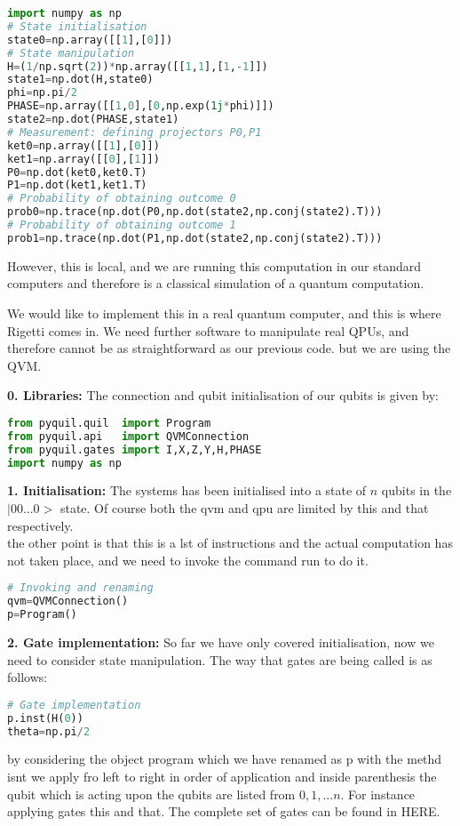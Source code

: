 \begin{lstlisting}[language=Python,caption={Example with python only},label={lst:ExamplePython},frame=single] 
import numpy as np
# State initialisation
state0=np.array([[1],[0]])
# State manipulation
H=(1/np.sqrt(2))*np.array([[1,1],[1,-1]])
state1=np.dot(H,state0)
phi=np.pi/2
PHASE=np.array([[1,0],[0,np.exp(1j*phi)]])
state2=np.dot(PHASE,state1)
# Measurement: defining projectors P0,P1
ket0=np.array([[1],[0]])
ket1=np.array([[0],[1]])
P0=np.dot(ket0,ket0.T)
P1=np.dot(ket1,ket1.T)
# Probability of obtaining outcome 0
prob0=np.trace(np.dot(P0,np.dot(state2,np.conj(state2).T)))
# Probability of obtaining outcome 1
prob1=np.trace(np.dot(P1,np.dot(state2,np.conj(state2).T)))
\end{lstlisting}
However, this is local, and we are running this computation in our standard computers and therefore is a classical simulation of a quantum computation.

We would like to implement this in a real quantum computer, and this is where Rigetti comes in. We need further software to manipulate real QPUs, and therefore cannot be as straightforward as our previous code. but we are using the QVM.


{\bf 0. Libraries:} The connection and qubit initialisation of our qubits is given by:
\begin{lstlisting}[language=Python]
from pyquil.quil  import Program 
from pyquil.api   import QVMConnection 
from pyquil.gates import I,X,Z,Y,H,PHASE
import numpy as np
\end{lstlisting}

{\bf 1. Initialisation:} The systems has been initialised into a state of $n$
 qubits in the $|00...0>$ state. Of course both the qvm and qpu are limited by this and that respectively.\\ 
 
 the other point is that this is a lst of instructions and the actual computation has not taken place, and we need to invoke the command run to do it.\\
\begin{lstlisting}[language=Python,firstnumber=5] 
# Invoking and renaming
qvm=QVMConnection()
p=Program()
\end{lstlisting} %
 
 {\bf 2. Gate implementation:} So far we have only covered initialisation, now we need to consider state manipulation. The way that gates are being called is as follows:
\begin{lstlisting}[language=Python,firstnumber=8]
# Gate implementation
p.inst(H(0))
theta=np.pi/2
\end{lstlisting}
 by considering the object program which we have renamed as p with the methd isnt we apply fro left to right in order of application and inside parenthesis the qubit which is acting upon the qubits are listed from $0,1,...n$. For instance applying gates this and that. The complete set of gates can be found in HERE.\\
 
